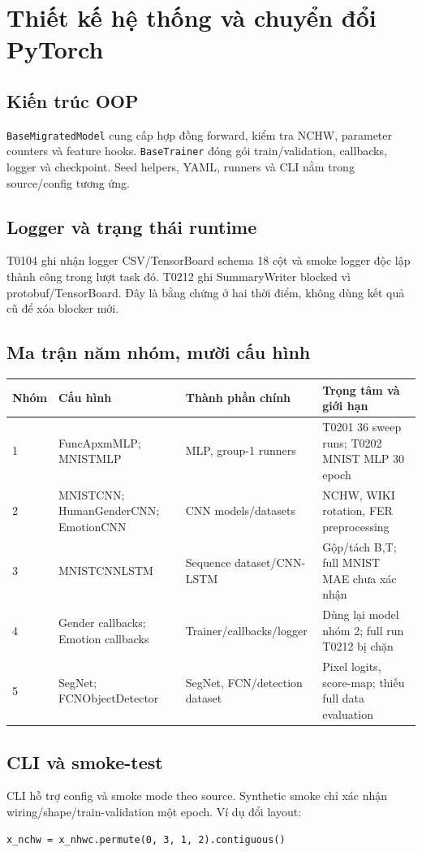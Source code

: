 \chapter{Thiết kế hệ thống và chuyển đổi PyTorch}
\section{Kiến trúc OOP}
\texttt{BaseMigratedModel} cung cấp hợp đồng forward, kiểm tra NCHW, parameter counters và feature hooks. \texttt{BaseTrainer} đóng gói train/validation, callbacks, logger và checkpoint. Seed helpers, YAML, runners và CLI nằm trong source/config tương ứng.

\section{Logger và trạng thái runtime}
T0104 ghi nhận logger CSV/TensorBoard schema 18 cột và smoke logger độc lập thành công trong lượt task đó. T0212 ghi SummaryWriter blocked vì protobuf/TensorBoard. Đây là bằng chứng ở hai thời điểm, không dùng kết quả cũ để xóa blocker mới.

\section{Ma trận năm nhóm, mười cấu hình}
\begin{longtable}{p{}p{}p{}p{}}
\toprule Nhóm & Cấu hình & Thành phần chính & Trọng tâm và giới hạn \\
\midrule
1 & FuncApxmMLP; MNISTMLP & MLP, group-1 runners & T0201 36 sweep runs; T0202 MNIST MLP 30 epoch \\
2 & MNISTCNN; HumanGenderCNN; EmotionCNN & CNN models/datasets & NCHW, WIKI rotation, FER preprocessing \\
3 & MNISTCNNLSTM & Sequence dataset/CNN-LSTM & Gộp/tách B,T; full MNIST MAE chưa xác nhận \\
4 & Gender callbacks; Emotion callbacks & Trainer/callbacks/logger & Dùng lại model nhóm 2; full run T0212 bị chặn \\
5 & SegNet; FCNObjectDetector & SegNet, FCN/detection dataset & Pixel logits, score-map; thiếu full data evaluation \\
\bottomrule
\end{longtable}

\section{CLI và smoke-test}
CLI hỗ trợ config và smoke mode theo source. Synthetic smoke chỉ xác nhận wiring/shape/train-validation một epoch. Ví dụ đổi layout:
\begin{lstlisting}[style=python,caption={Đổi layout tensor ảnh}]
x_nchw = x_nhwc.permute(0, 3, 1, 2).contiguous()
\end{lstlisting}